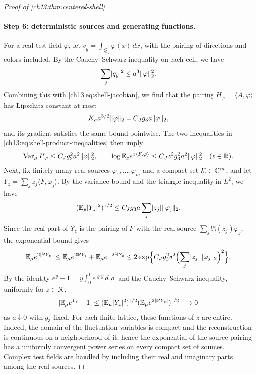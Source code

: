 \begin{proof}[Proof of \cref{ch13:thm:centered-shell}]
\paragraph{Step 6: deterministic sources and generating functions.}
For a real test field $\varphi$, let $q_y=\int_{Q_y}\varphi(x)\,dx$, with the pairing of directions and colors included. By the Cauchy--Schwarz inequality on each cell, we have
\begin{equation}\label{ch13:eq:source-cell-weights}
 \sum_y\lvert q_y\rvert^2\le a^3\lVert \varphi\rVert_2^2.
\end{equation}
Combining this with \eqref{ch13:eq:shell-jacobian}, we find that the pairing $H_\varphi=\langle A,\varphi\rangle$ has Lipschitz constant at most
\[
 K_aa^{3/2}\lVert \varphi\rVert_2=C_Jg_3a\lVert \varphi\rVert_2,
\]
and its gradient satisfies the same bound pointwise. The two inequalities in \eqref{ch13:eq:shell-product-inequalities} then imply
\[
 \operatorname{Var}_\mu H_\varphi\le C_Jg_3^2a^2\lVert \varphi\rVert_2^2,\qquad\log\mathbb E_\mu e^{z\langle F,\varphi\rangle}\le C_Jz^2g_3^2a^2\lVert \varphi\rVert_2^2\quad(z\in\mathbb R).
\]
Next, fix finitely many real sources $\varphi_1,\dots,\varphi_m$ and a compact set $\mathcal K\subset\mathbb C^m$, and let $Y_z=\sum_jz_j\langle F,\varphi_j\rangle$. By the variance bound and the triangle inequality in $L^2$, we have
\[
 (\mathbb E_\mu\lvert Y_z\rvert^2)^{1/2}\le C_Jg_3a\sum_j\lvert z_j\rvert\lVert \varphi_j\rVert_2.
\]
Since the real part of $Y_z$ is the pairing of $F$ with the real source $\sum_j\Re(z_j)\varphi_j$, the exponential bound gives
\[
 \mathbb E_\mu e^{2\lvert \Re Y_z\rvert}\le\mathbb E_\mu e^{2\Re Y_z}+\mathbb E_\mu e^{-2\Re Y_z}\le2\exp\Bigl\{C_Jg_3^2a^2\Bigl(\sum_j\lvert z_j\rvert\lVert \varphi_j\rVert_2\Bigr)^2\Bigr\}.
\]
By the identity $e^y-1=y\int_0^1e^{\varrho y}\,d\varrho$ and the Cauchy--Schwarz inequality, uniformly for $z\in\mathcal K$,
\[
 \lvert \mathbb E_\mu e^{Y_z}-1\rvert\le(\mathbb E_\mu\lvert Y_z\rvert^2)^{1/2}(\mathbb E_\mu e^{2\lvert \Re Y_z\rvert})^{1/2}\longrightarrow0
\]
as $a\downarrow0$ with $g_3$ fixed. For each finite lattice, these functions of $z$ are entire. Indeed, the domain of the fluctuation variables is compact and the reconstruction is continuous on a neighborhood of it; hence the exponential of the source pairing has a uniformly convergent power series on every compact set of sources. Complex test fields are handled by including their real and imaginary parts among the real sources.


\end{proof}
